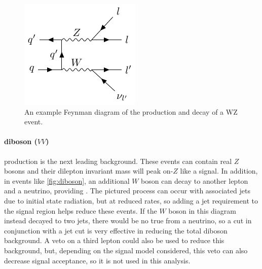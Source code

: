 \begin{centering}
\begin{figure}[bth]
\myfloatalign
\includegraphics[width=.70\linewidth]{feynman/diboson.pdf}
\caption{An example Feynman diagram of the production and decay of a WZ event.}
\label{fig:diboson}
\end{figure}
\end{centering}

\paragraph{diboson ($VV$)} production is the next leading background. These events can contain real $Z$ bosons and their dilepton invariant mass will peak on-$Z$ like a signal. In addition, in events like \autoref{fig:diboson}, an additional $W$ boson can decay to another lepton and a neutrino, providing \MET. The pictured process can occur with associated jets due to initial state radiation, but at reduced rates, so adding a jet requirement to the signal region helps reduce these events. If the $W$ boson in this diagram instead decayed to two jets, there would be no true \MET from a neutrino, so a \MET cut in conjunction with a jet cut is very effective in reducing the total diboson background. A veto on a third lepton could also be used to reduce this background, but, depending on the signal model considered, this veto can also decrease signal acceptance, so it is not used in this analysis.

